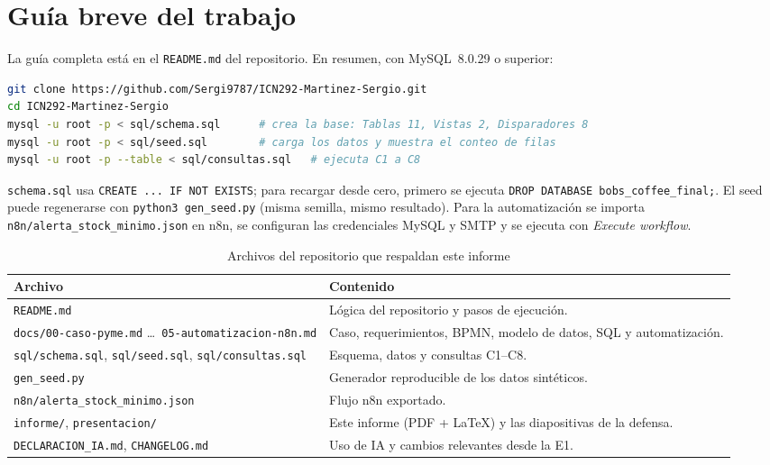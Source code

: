 \documentclass[11pt,letterpaper]{article}
\newcommand{\tablasize}{\footnotesize}
\begin{document}
\section{Guía breve del trabajo}
\label{sec:guia}
La guía completa está en el \texttt{README.md} del repositorio. En resumen, con MySQL~8.0.29 o superior:
\begin{lstlisting}[language=bash,morekeywords={git,cd,mysql}]
git clone https://github.com/Sergi9787/ICN292-Martinez-Sergio.git
cd ICN292-Martinez-Sergio
mysql -u root -p < sql/schema.sql      # crea la base: Tablas 11, Vistas 2, Disparadores 8
mysql -u root -p < sql/seed.sql        # carga los datos y muestra el conteo de filas
mysql -u root -p --table < sql/consultas.sql   # ejecuta C1 a C8
\end{lstlisting}
\texttt{schema.sql} usa \texttt{CREATE ... IF NOT EXISTS}; para recargar desde cero, primero se ejecuta \texttt{DROP DATABASE bobs\_coffee\_final;}. El seed puede regenerarse con \texttt{python3 gen\_seed.py} (misma semilla, mismo resultado). Para la automatización se importa \texttt{n8n/alerta\_stock\_minimo.json} en n8n, se configuran las credenciales MySQL y SMTP y se ejecuta con \emph{Execute workflow}.

{\tablasize
\begin{longtable}{>{\raggedright\arraybackslash}p{5.2cm}>{\raggedright\arraybackslash}p{9.4cm}}
\caption{Archivos del repositorio que respaldan este informe}\label{tab:repo}\\
\toprule \textbf{Archivo} & \textbf{Contenido} \\ \midrule
\texttt{README.md} & Lógica del repositorio y pasos de ejecución. \\
\texttt{docs/00-caso-pyme.md} \ldots\ \texttt{05-automatizacion-n8n.md} & Caso, requerimientos, BPMN, modelo de datos, SQL y automatización. \\
\texttt{sql/schema.sql}, \texttt{sql/seed.sql}, \texttt{sql/consultas.sql} & Esquema, datos y consultas C1--C8. \\
\texttt{gen\_seed.py} & Generador reproducible de los datos sintéticos. \\
\texttt{n8n/alerta\_stock\_minimo.json} & Flujo n8n exportado. \\
\texttt{informe/}, \texttt{presentacion/} & Este informe (PDF + \LaTeX) y las diapositivas de la defensa. \\
\texttt{DECLARACION\_IA.md}, \texttt{CHANGELOG.md} & Uso de IA y cambios relevantes desde la E1. \\
\bottomrule
\end{longtable}
}
\end{document}

